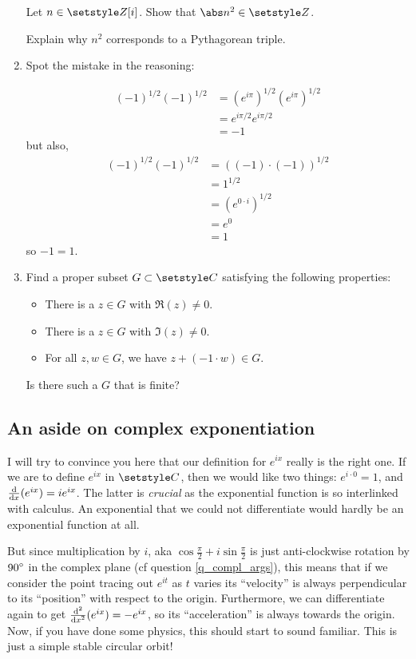 \begin{enumerate}
  Let \(n \in \Integers[i]\). Show that \(\abs n^2 \in \Integers\).

  Explain why \(n^2\) corresponds to a Pythagorean triple.
 \item \label{q_comp_zw_exp}
  Spot the mistake in the reasoning:
  \begin{tcolorbox}
   \begin{align*}
    (-1)^{1/2} (-1)^{1/2}
     &= (e^{i\pi})^{1/2} (e^{i\pi})^{1/2} \\
     &= e^{i\pi/2} e^{i\pi/2} \\
     &= -1
   \end{align*}
   but also,
   \begin{align*}
    (-1)^{1/2} (-1)^{1/2}
     &= ((-1) \cdot (-1))^{1/2} \\
     &= 1^{1/2} \\
     &= (e^{0 \cdot i})^{1/2} \\
     &= e^0 \\
     &= 1
   \end{align*}
   so \(-1 = 1\).
  \end{tcolorbox}
 \item
  Find a proper subset \(G \subset \Complex\) satisfying the following
  properties:
  \begin{itemize}
   \item
    There is a \(z \in G\) with \(\Re(z) \ne 0\).
   \item
    There is a \(z \in G\) with \(\Im(z) \ne 0\).
   \item
    For all \(z, w \in G\), we have \(z  + (-1 \cdot w) \in G\).
  \end{itemize}
  Is there such a \(G\) that is finite?
\end{enumerate}

\subsection{An aside on complex exponentiation}

I will try to convince you here that our definition for \(e^{ix}\) really is the
right one. If we are to define \(e^{ix}\) in \(\Complex\), then we would like
two things: \(e^{i \cdot 0} = 1\), and \(\dv{x} (e^{ix}) = ie^{ix}\). The latter
is \emph{crucial} as the exponential function is so interlinked with calculus.
An exponential that we could not differentiate would hardly be an exponential
function at all.

But since multiplication by \(i\), aka
\(\cos \frac \pi 2 + i \sin \frac \pi 2\) is just anti-clockwise rotation by
\({90}^\circ\) in the complex plane (cf question \ref{q_compl_args}), this
means that if we consider the point tracing out \(e^{it}\) as \(t\) varies its
``velocity'' is always perpendicular to its ``position'' with respect to the
origin. Furthermore, we can differentiate again to get
\(\dv[2]{x} (e^{ix}) = -e^{ix}\), so its ``acceleration'' is always towards the
origin. Now, if you have done some physics, this should start to sound familiar.
This is just a simple stable circular orbit!

